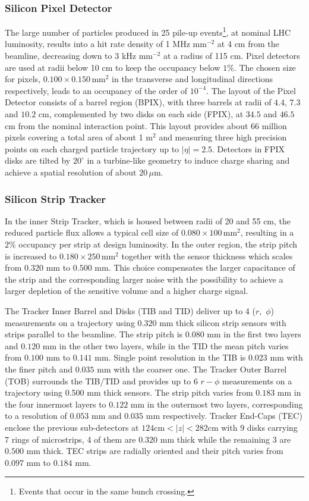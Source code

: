 \subsubsection{Silicon Pixel Detector}
The large number of particles produced in 25 pile-up events\footnote{Events that occur in the same bunch crossing.}, at nominal LHC
luminosity, results into a hit rate density of 1 MHz mm$^{-2}$ at 4 cm from the beamline,
decreasing down to 3 kHz mm$^{-2}$ at a radius of 115 cm. Pixel detectors are used
at radii below 10 cm to keep the occupancy below $1\%$. The chosen size for pixels,
$0.100\times0.150\,\mathrm{mm}^2$ in the transverse and longitudinal directions respectively, leads
to an occupancy of the order of $10^{-4}$. The layout of the Pixel Detector consists
of a barrel region (BPIX), with three barrels at radii of $4.4$, $7.3$ and $10.2$ cm,
complemented by two disks on each side (FPIX), at $34.5$ and $46.5$ cm from the
nominal interaction point. This layout provides about 66 million pixels covering a
total area of about 1 m$^2$ and measuring three high precision points on each charged
particle trajectory up to $|\eta|=2.5$. Detectors in FPIX disks are tilted by $20^\circ$ in a
turbine-like geometry to induce charge sharing and achieve a spatial resolution of
about $20\,\mu\mathrm{m}$.

\subsubsection{Silicon Strip Tracker}
In the inner Strip Tracker, which is housed between radii of 20 and 55 cm, the
reduced particle flux allows a typical cell size of $0.080\times100\,\mathrm{mm}^2$, resulting in a
$2\%$ occupancy per strip at design luminosity. In the outer region, the strip pitch
is increased to $0.180\times250\,\mathrm{mm}^2$ together with the sensor thickness which scales
from $0.320$ mm to $0.500$ mm. This choice compensates the larger capacitance of
the strip and the corresponding larger noise with the possibility to achieve a larger
depletion of the sensitive volume and a higher charge signal.

The Tracker Inner Barrel and Disks (TIB and TID) deliver up to 4 \mbox{($r$, $\phi$)} measurements 
on a trajectory using $0.320$ mm thick silicon strip sensors with strips
parallel to the beamline. The strip pitch is $0.080$ mm in the first two layers and
$0.120$ mm in the other two layers, while in the TID the mean pitch varies from
$0.100$ mm to $0.141$ mm. Single point resolution in the TIB is $0.023$ mm with the
finer pitch and $0.035$ mm with the coarser one. The Tracker Outer Barrel (TOB)
surrounds the TIB/TID and provides up to 6 $r-\phi$ measurements on a trajectory
using 0.500 mm thick sensors. The strip pitch varies from $0.183$ mm in the four
innermost layers to $0.122$ mm in the outermost two layers, corresponding to a resolution 
of $0.053$ mm and $0.035$ mm respectively. Tracker End-Caps (TEC) enclose
the previous sub-detectors at $124\mathrm{cm}<|z|<282\mathrm{cm}$ with 9 disks carrying 7 rings
of microstrips, 4 of them are $0.320$ mm thick while the remaining 3 are $0.500$ mm
thick. TEC strips are radially oriented and their pitch varies from $0.097$ mm to
$0.184$ mm.

